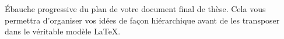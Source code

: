 Ébauche progressive du plan de votre document final de thèse. Cela vous permettra d'organiser vos idées de façon hiérarchique avant de les transposer dans le véritable modèle LaTeX.
